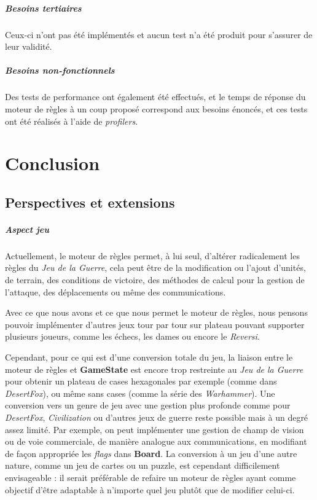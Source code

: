 \documentclass[a4paper]{report}
\begin{document}
\paragraph*{Besoins tertiaires}
Ceux-ci n'ont pas été implémentés et aucun test n'a été produit pour s'assurer de leur validité.

\paragraph*{Besoins non-fonctionnels}
Des tests de performance ont également été effectués, et le temps de réponse du moteur de règles à un coup proposé correspond aux besoins énoncés, et ces tests ont été réalisés à l'aide de \textit{profilers}.

\chapter{Conclusion}

\section{Perspectives et extensions}

\paragraph*{Aspect jeu}
Actuellement, le moteur de règles permet, à lui seul, d'altérer radicalement les règles du {\it Jeu de la Guerre}, cela peut être de la modification ou l'ajout d'unités, de terrain, des conditions de victoire, des méthodes de calcul pour la gestion de l'attaque, des déplacements ou même des communications.

Avec ce que nous avons et ce que nous permet le moteur de règles, nous pensons pouvoir implémenter d'autres jeux tour par tour sur plateau pouvant supporter plusieurs joueurs, comme les échecs, les dames ou encore le \textit{Reversi}.

Cependant, pour ce qui est d'une conversion totale du jeu, la liaison entre le moteur de règles et \textbf{GameState} est encore trop restreinte au {\it Jeu de la Guerre} pour obtenir un plateau de cases hexagonales par exemple (comme dans {\it DesertFox}), ou même sans cases (comme la série des {\it Warhammer}). Une conversion vers un genre de jeu avec une gestion plus profonde comme pour {\it DesertFox}, {\it Civilization} ou d'autres jeux de guerre reste possible mais à un degré assez limité. Par exemple, on peut implémenter une gestion de champ de vision ou de voie commerciale, de manière analogue aux communications, en modifiant de façon appropriée les {\it flags} dans \textbf{Board}. La conversion à un jeu d'une autre nature, comme un jeu de cartes ou un puzzle, est cependant difficilement envisageable : il serait préférable de refaire un moteur de règles ayant comme objectif d'être adaptable à n'importe quel jeu plutôt que de modifier celui-ci.
\end{document}
